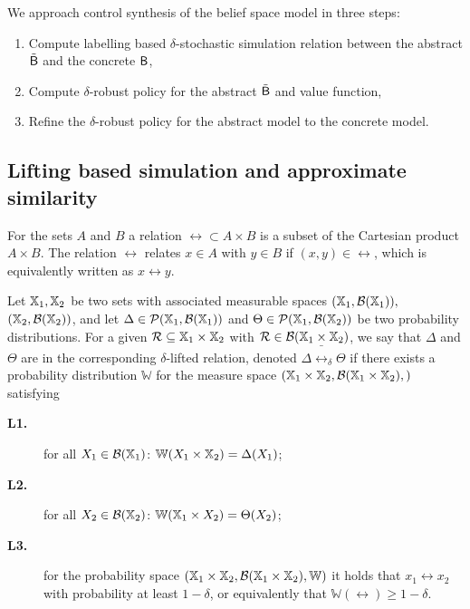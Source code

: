 \documentclass{ifacconf}
\begin{document}
We approach control synthesis of the belief space model in three steps:
\begin{enumerate}
\item Compute labelling based $\delta$-stochastic  simulation relation between  the abstract $\tilde{\mathsf{B}}$ and the concrete $\mathsf{B}$,
\item Compute $\delta$-robust policy for the abstract $\tilde{\mathsf{B}}$ and value function,
\item Refine the $\delta$-robust policy for the abstract model to the concrete model.
\end{enumerate}
\subsection{Lifting based simulation  and approximate similarity}
For the sets $A$ and $B$ a relation $\rel\subset A\times B$ is a subset of the Cartesian product $A\times B$. The relation $\rel$ relates $x\in A$ with $y\in B$ if $(x,y)\in\rel$, which is equivalently written as $x\rel y$. 

	Let ${\mathbb{X}}_1,{\mathbb{X}}_2$ be two sets with associated measurable spaces $({\mathbb{X}}_1,\mathcal B({\mathbb{X}}_1)),$ $({\mathbb{X}}_2,\mathcal B({\mathbb{X}}_2))$,
	and let   $\Delta\in \mathcal{P}({\mathbb{X}}_1,\mathcal B({\mathbb{X}}_1)) $ and  $\Theta\in \mathcal{P}({\mathbb{X}}_1,\mathcal B({\mathbb{X}}_2)) $ be two probability distributions. 
%	
For a given 
	$\mathcal{R}\subseteq {\mathbb{X}}_1\times {\mathbb{X}}_2$ with $\mathcal{R}\in \mathcal B({\mathbb{X}}_1\times {\mathbb{X}}_2)$, we say that  $\Delta$ and $ \Theta$ are in the corresponding $\delta$-lifted relation, denoted $\Delta \bar \rel_\delta \Theta$  if there exists a probability distribution $\mathbb W$ for the measure space $({\mathbb{X}}_1\times {\mathbb{X}}_2,\mathcal B({\mathbb{X}}_1\times {\mathbb{X}}_2),)$
	satisfying { \setlength{\parskip}{-1pt}\setlength{\parsep}{0pt}
		\begin{description}
			\item[\textbf{L1.}] for all $X_1\in \mathcal{B}({\mathbb{X}}_1)$: $\mathbb W(X_1\times {\mathbb{X}}_2)=\Delta(X_1)$;
			\item [\textbf{L2.}] for all $X_2\in \mathcal{B}({\mathbb{X}}_2)$:  $\mathbb W({\mathbb{X}}_1\times X_2)=\Theta(X_2)$;
			\item[\textbf{L3.}] for the probability space  $({\mathbb{X}}_1\times {\mathbb{X}}_2,\mathcal B({\mathbb{X}}_1\times {\mathbb{X}}_2), \mathbb W)$ it holds that
			$x_1\rel x_2$ with probability at least $1-\delta$, or equivalently that $\mathbb{W}\left(\rel\right)\geq1-\delta$.
	\end{description}}%
	
\end{document}

